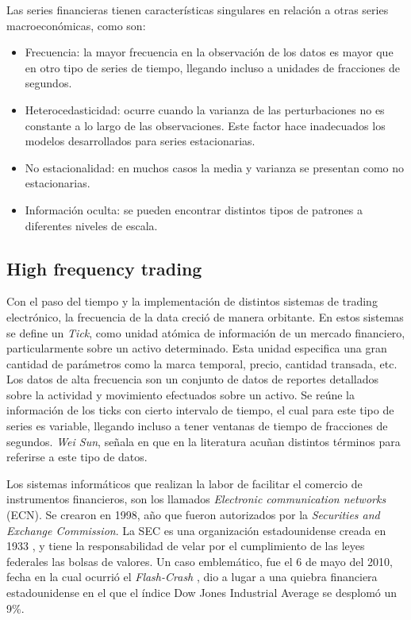 Las series financieras tienen características singulares en relación a otras series macroeconómicas, como son: 
\begin{itemize}
	\item Frecuencia: la mayor frecuencia en la observación de los datos es mayor que en otro tipo de series de tiempo, llegando incluso
		a unidades de fracciones de segundos.
	\item Heterocedasticidad: ocurre cuando la varianza de las perturbaciones no es constante a lo largo de las observaciones.
		Este factor hace inadecuados los modelos desarrollados para series estacionarias.
	\item No estacionalidad: en muchos casos la media y varianza se presentan como no estacionarias.
	\item Información oculta: se pueden encontrar distintos tipos de patrones a diferentes niveles de escala.
\end{itemize}

\subsection{High frequency trading}

Con el paso del tiempo y la implementación de distintos sistemas de trading electrónico, la frecuencia de la data creció de manera
orbitante. En estos sistemas se define un \emph{Tick}, como unidad atómica de información de un mercado financiero, particularmente sobre un activo determinado.
Esta unidad especifica una gran cantidad de parámetros como la marca temporal, precio, cantidad transada, etc. Los datos de alta frecuencia son un conjunto de datos 
de reportes detallados sobre la actividad y movimiento efectuados sobre un activo. Se reúne la información de los ticks con cierto intervalo de tiempo, 
el cual para este tipo de series es variable, llegando incluso a tener ventanas de tiempo de fracciones de segundos. \emph{Wei Sun}, señala en \cite{ei2007quantitative}
que en la literatura acuñan distintos términos para referirse a este tipo de datos.

Los sistemas informáticos que realizan la labor de facilitar el comercio de instrumentos financieros, son los llamados \emph{Electronic communication networks} (ECN).
Se crearon en 1998, año que fueron autorizados por la \emph{Securities and Exchange Commission}. La SEC es una organización estadounidense creada en 1933 \cite{hasbrouck2004economic}, 
y tiene la responsabilidad de velar por el cumplimiento de las leyes federales las bolsas de valores. Un caso emblemático, fue el 6 de mayo del 2010, fecha en la cual ocurrió el 
\emph{Flash-Crash} \cite{arndt2011high}, dio a lugar a una quiebra financiera estadounidense en el que el índice Dow Jones Industrial Average se desplomó un 9\%.

